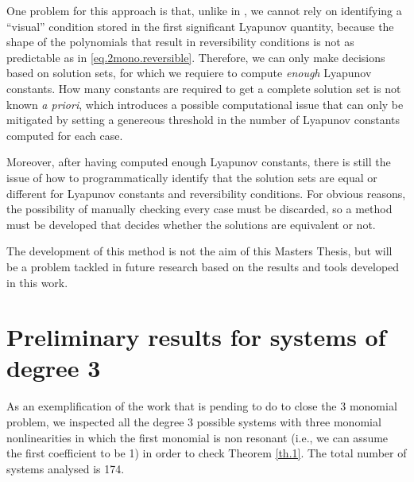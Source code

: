 One problem for this approach is that, unlike in \textcite{Gasull2016}, we cannot rely on identifying a ``visual'' condition stored in the first significant Lyapunov quantity, because the shape of the polynomials that result in reversibility conditions is not as predictable as in \eqref{eq.2mono.reversible}. Therefore, we can only make decisions based on solution sets, for which we requiere to compute \emph{enough} Lyapunov constants. How many constants are required to get a complete solution set is not known 	\emph{a priori}, which introduces a possible computational issue that can only be mitigated by setting a genereous threshold in the number of Lyapunov constants computed for each case.

Moreover, after having computed enough Lyapunov constants, there is still the issue of how to programmatically identify that the solution sets are equal or different for Lyapunov constants and reversibility conditions. For obvious reasons, the possibility of manually checking every case must be discarded, so a method must be developed that decides whether the solutions are equivalent or not.

The development of this method is not the aim of this Masters Thesis, but will be a problem tackled in future research based on the results and tools developed in this work.



\section{Preliminary results for systems of degree 3}

As an exemplification of the work that is pending to do to close the 3 monomial problem, we inspected all the degree 3 possible systems with three monomial nonlinearities in which the first monomial is non resonant (i.e., we can assume the first coefficient to be 1) in order to check Theorem \ref{th.1}. The total number of systems analysed is 174.

